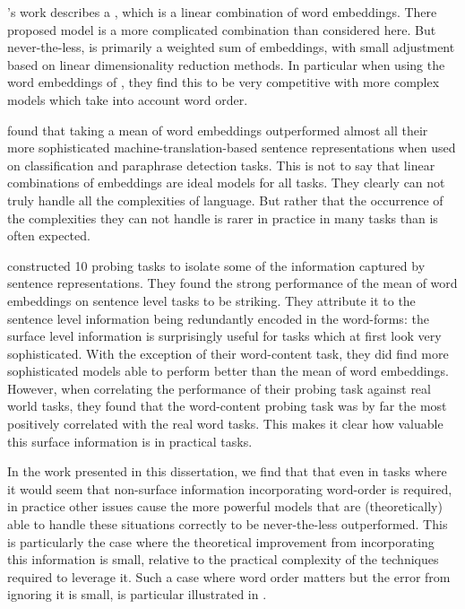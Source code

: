 \documentclass{book}
\begin{document}
\citet{arora2016simple}'s work describes a ,
which is a linear combination of word embeddings.
There proposed model is a more complicated combination than considered here.
But never-the-less, is primarily a weighted sum of embeddings, with small adjustment based on linear dimensionality reduction methods.
In particular when using the word embeddings of \citet{wieting2015towards}, they find this to be very competitive with more complex models which take into account word order.

\citet{acl2018bleuopposedmeaning} found that taking a mean of word embeddings outperformed almost all their more sophisticated machine-translation-based sentence representations when used on classification and paraphrase detection tasks.
This is not to say that linear combinations of embeddings are ideal models for all tasks.
They clearly can not truly handle all the complexities of language.
But rather that the occurrence of the complexities they can not handle is rarer in practice in many tasks than is often expected.

\citet{ac2018probingsentencevectors} constructed 10 probing tasks to isolate some of the information captured by sentence representations.
They found the strong performance of the mean of word embeddings on sentence level tasks to be striking.
They attribute it to the sentence level information being redundantly encoded in the word-forms: the surface level information is surprisingly useful for tasks which at first look very sophisticated.
With the exception of their word-content task, they did find more sophisticated models able to perform better than the mean of word embeddings.
However, when correlating the performance of their probing task against real world tasks,
they found that the word-content probing task was by far the most positively correlated with the real word tasks.
This makes it clear how valuable this surface information is in practical tasks.



In the work presented in this dissertation, 
we find that that even in tasks where it would seem that non-surface information incorporating word-order is required,
in practice other issues cause the more powerful models that are (theoretically) able to handle these situations correctly to be never-the-less outperformed.
This is particularly the case where the theoretical improvement from incorporating this information is small, relative to the practical complexity of the techniques required to leverage it.
Such a case where word order matters but the error from ignoring it is small, is particular illustrated in .
\end{document}
